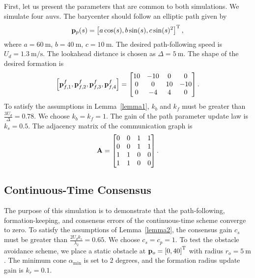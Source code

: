 First, let us present the parameters that are common to both simulations.
We simulate four \glspl{auv}.
The barycenter should follow an elliptic path given by
\begin{equation}
    \mathbf{p}_p(s) = \left[a \cos(s), b \sin(s), c \sin(s)^2\right]^{\mathrm{T}},
\end{equation}
where $a = \SI{60}{\meter}$, $b = \SI{40}{\meter}$, $c = \SI{10}{\meter}$.
The desired path-following speed is $U_d = \SI{1.3}{\meter\per\second}$.
The lookahead distance is chosen as $\Delta = \SI{5}{\meter}$.
The shape of the desired formation is
\begin{equation}
    \left[\mathbf{p}_{f, 1}^f, \mathbf{p}_{f, 2}^f, \mathbf{p}_{f, 3}^f, \mathbf{p}_{f, 4}^f\right]
    =
    \begin{bmatrix}
        10 & -10 & 0 & 0\\ 0 & 0 & 10 & -10\\ 0 & -4 & 4 & 0
    \end{bmatrix}.
\end{equation}
To satisfy the assumptions in Lemma~\ref{lemma1}, $k_b$ and $k_f$ must be greater than $\frac{3U_d}{\Delta} = 0.78$.
We choose $k_b = k_f = 1$.
The gain of the path parameter update law is $k_s = 0.5$.
The adjacency matrix of the communication graph is
\begin{equation}
    \mathbf{A}
    =
    \begin{bmatrix}
        0 & 0 & 1 & 1\\ 0 & 0 & 1 & 1\\ 1 & 1 & 0 & 0\\ 1 & 1 & 0 & 0
    \end{bmatrix}.
\end{equation}

\subsection{Continuous-Time Consensus}

The purpose of this simulation is to demonstrate that the path-following, formation-keeping, and consensus errors of the continuous-time scheme converge to zero.
To satisfy the assumptions of Lemma~\ref{lemma2}, the consensus gain $c_s$ must be greater than $\frac{2 U_d k_s}{\lambda_2} = 0.65$. We choose $c_s = c_p = 1$.
To test the obstacle avoidance scheme, we place a static obstacle at $\mathbf{p}_o = \left[0, 40\right]^{\mathrm{T}}$ with radius $r_o = \SI{5}{\meter}$.
The minimum cone $\alpha_{\min}$ is set to $2$ degrees, and the formation radius update gain is $k_r = 0.1$.

